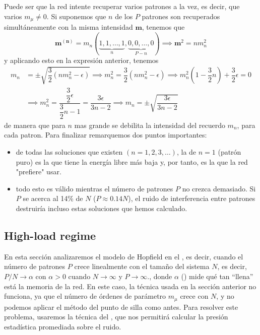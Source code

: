 Puede ser que la red intente recuperar varios patrones a la vez, es decir, que varios $m_{\mu} \neq 0$. Si suponemos que $n$ de los $P$ patrones son recuperados simultáneamente con la misma intensidad $\mathbf{m}$, tenemos que 
\begin{equation*}
    \mathbf{m^{(n)}}=m_n(\underbrace{1,1,\ldots,1}_{n},\underbrace{0,0,\ldots,0}_{P-n}) \implies \mathbf{m}^2 = n m_n^2
\end{equation*}
y aplicando esto en la expresión anterior, tenemos
\begin{align*}
    m_n &= \pm \sqrt{\dfrac{3}{2}(n m_n^2 - \epsilon)} \implies m_n^2= \dfrac{3}{2}(n m_n^2 - \epsilon)\implies m_n^2\left(1-\dfrac{3}{2}n\right) + \dfrac{3}{2}\epsilon = 0 \\
    &\implies m_n^2 = \dfrac{\dfrac{3}{2}\epsilon}{\dfrac{3}{2}n - 1} = \dfrac{3\epsilon}{3n - 2} \implies m_n = \pm \sqrt{\dfrac{3\epsilon}{3n - 2}}
\end{align*}
de manera que para $n$ mas grande se debilita la intensidad del recuerdo $m_n$, para cada patron. Para finalizar remarquemos dos puntos importantes:
\begin{itemize}
    \item {} de todas las soluciones que existen $(n=1,2,3,\ldots)$, la de $n=1$ (patrón puro) es la que tiene la energía libre más baja y, por tanto, es la que la red "prefiere" usar.
    \item {} todo esto es válido mientras el número de patrones $P$ no crezca demasiado. Si $P$ se acerca al 14\% de $N$ ($P \approx 0.14N$), el ruido de interferencia entre patrones destruiría incluso estas soluciones que hemos calculado.
\end{itemize}

\subsection{High-load regime}

\noindent
En esta sección analizaremos el modelo de Hopfield en el , es decir, cuando el número de patrones $P$ crece linealmente con el tamaño del sistema $N$, es decir, $P/N \to \alpha$ con $\alpha > 0$ cuando $N\to\infty$ y $P\to \infty$., donde $\alpha$ () mide qué tan ``llena'' está la memoria de la red. En este caso, la técnica usada en la sección anterior no funciona, ya que el número de órdenes de parámetro $m_{\mu}$ crece con $N$, y no podemos aplicar el método del punto de silla como antes. Para resolver este problema, usaremos la técnica del , que nos permitirá calcular la presión estadística promediada sobre el ruido. \\

